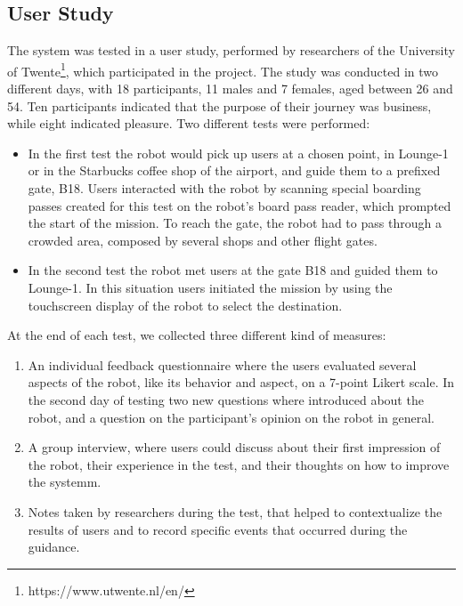 \subsection{User Study}

The system was tested in a user study, performed by researchers of the University of Twente\footnote{https://www.utwente.nl/en/}, which participated in the project. The study was conducted in two different days, with 18 participants, 11 males and 7 females, aged between 26 and 54. Ten participants indicated that the purpose of their journey was business, while eight indicated pleasure. Two different tests were performed:

\begin{itemize} 
\item In the first test the robot would pick up users at a chosen point, in Lounge-1 or in the Starbucks coffee shop of the airport, and guide them to a prefixed gate, B18. Users interacted with the robot by scanning special boarding passes created for this test on the robot's board pass reader, which prompted the start of the mission. To reach the gate, the robot had to pass through a crowded area, composed by several shops and other flight gates.
\item In the second test the robot met users at the gate B18 and guided them to Lounge-1. In this situation users initiated the mission by using the touchscreen display of the robot to select the destination.
\end{itemize}

At the end of each test, we collected three different kind of measures:
\begin{enumerate}
\item An individual feedback questionnaire where the users evaluated several aspects of the robot, like its behavior and aspect, on a 7-point Likert scale. In the second day of testing two new questions where introduced about the robot, and a question on the participant's opinion on the robot in general.
\item A group interview, where users could discuss about their first impression of the robot, their experience in the test, and their thoughts on how to improve the systemm.
\item  Notes taken by researchers during the test, that helped to contextualize the results of users and to record specific events that occurred during the guidance.
\end{enumerate}


